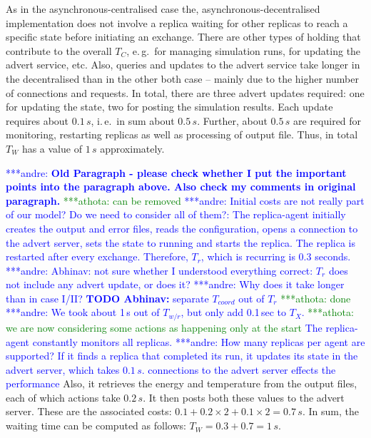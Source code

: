 \documentclass{rspublic}
\newcommand{\alnote}[1]{ {\textcolor{blue} { ***andre: #1 }}}
\newcommand{\athotanote}[1]{ {\textcolor{green} { ***athota: #1 }}}
\newcommand{\alnote}[1]{}
\newcommand{\athotanote}[1]{}
\begin{document}
{%


As in the asynchronous-centralised case the,
asynchronous-decentralised implementation does not involve a replica
waiting for other replicas to reach a specific state before initiating
an exchange. There are other types of holding that contribute to the
overall $T_C$, e.\,g.\ for managing simulation runs, for updating the
advert service, etc. Also, queries and updates to the advert service
take longer in the decentralised than in the other both case -- mainly
due to the higher number of connections and requests. In total, there
are three advert updates required: one for updating the state, two for
posting the simulation results. Each update requires about $0.1\,s$,
i.\,e.\ in sum about $0.5\,s$. Further, about $0.5\,s$ are required
for monitoring, restarting replicas as well as processing of output
file. Thus, in total $T_{W}$ has a value of $1\,s$ approximately.

\alnote{\textbf{Old Paragraph - please check whether I put the important points into
the paragraph above. Also check my comments in original paragraph.} \athotanote{can be removed}
\alnote{Initial costs are not really part of our model? Do we 
need to consider all of them?: 
The replica-agent initially creates the output and error files, reads the configuration, 
opens a connection to the advert server, sets the state to running and starts the
replica. The replica is restarted after every exchange. Therefore, $T_r$, which is 
recurring is 0.3 seconds.} \alnote{Abhinav: not sure whether I understood everything correct: $T_r$ does not
include any advert update, or does it?} \alnote{Why does it take longer than in case I/II? 
\textbf{TODO Abhinav:} separate $T_{coord}$ out of $T_r$} \athotanote{done} \alnote{We took
about 1\,s out of $T_{w/r}$, but only add 0.1\,sec to $T_X$.} \athotanote{we are now considering some actions as happening only at the start}
The replica-agent constantly monitors all replicas. \alnote{How many replicas
per agent are supported?} If it finds
a replica that completed its run, it updates its state in the advert
server, which takes $0.1\,s$. 
connections to the advert server effects the performance} Also, it
retrieves the energy and temperature from the output files, each of
which actions take $0.2\,s$. It then posts both these values to the
advert server.  These are the associated costs:
$0.1+0.2\times2+0.1\times2=0.7\,s$.  In sum, the waiting time can be
computed as follows: $T_W = 0.3 + 0.7=1\,s$.  }
\end{document}

